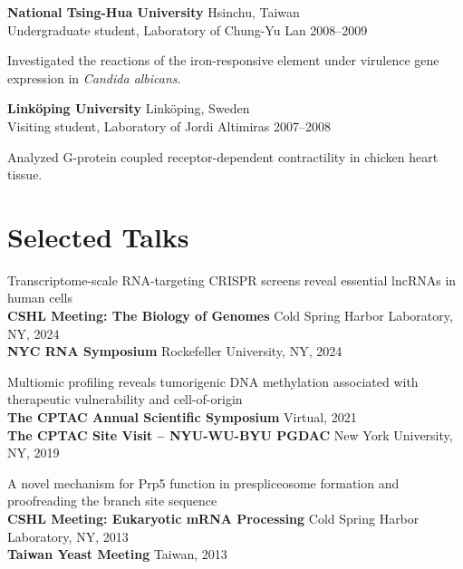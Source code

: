\documentclass[letterpaper,11pt]{cv}
\begin{document}
\begin{entrylist}
    \item \textbf{National Tsing-Hua University} \hfill Hsinchu, Taiwan\\
    Undergraduate student, Laboratory of Chung-Yu Lan \hfill
    2008--2009
    \begin{detaillist}
        \item Investigated the reactions of the iron-responsive element under virulence gene expression in \textit{Candida albicans}.
    \end{detaillist}
    
    \item \textbf{Linköping University} \hfill Linköping, Sweden\\
    Visiting student, Laboratory of Jordi Altimiras \hfill
    2007--2008
    \begin{detaillist}
        \item Analyzed G-protein coupled receptor-dependent contractility in chicken heart tissue.
    \end{detaillist}
    
    \end{entrylist}
    

\section{Selected Talks}
\begin{entrylist}
    \item \small{Transcriptome-scale RNA-targeting CRISPR screens reveal essential lncRNAs in human cells}\\
    \textbf{CSHL Meeting: The Biology of Genomes} \hfill Cold Spring Harbor Laboratory, NY, 2024 \\
    \textbf{NYC RNA Symposium} \hfill Rockefeller University, NY, 2024
    \item \small{Multiomic profiling reveals tumorigenic DNA methylation associated with therapeutic vulnerability and cell-of-origin}\\ \textbf{The CPTAC Annual Scientific Symposium} \hfill Virtual, 2021 \\
    \textbf{The CPTAC Site Visit – NYU-WU-BYU PGDAC} \hfill New York University, NY, 2019
    \item \small{A novel mechanism for Prp5 function in prespliceosome formation and proofreading the branch site sequence}\\
    \textbf{CSHL Meeting: Eukaryotic mRNA Processing} \hfill Cold Spring Harbor Laboratory, NY, 2013 \\
    \textbf{Taiwan Yeast Meeting} \hfill Taiwan, 2013


\end{entrylist}
\end{document}
